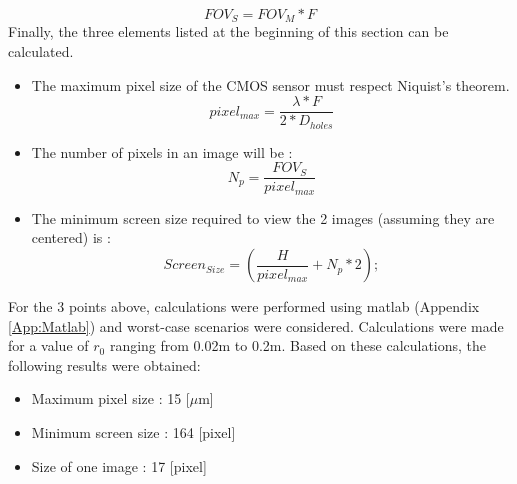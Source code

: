 \begin{equation}
    FOV_S = FOV_M * F
\end{equation}
Finally, the three elements listed at the beginning of this section can be calculated.
\begin{itemize}
    \item The maximum pixel size of the CMOS sensor must respect Niquist's theorem.
          \begin{equation}
              pixel_{max} = \frac{\lambda*F}{2*D_{holes}}
          \end{equation}
    \item The number of pixels in an image will be :
          \begin{equation}
              N_{p} = \frac{FOV_S}{pixel_{max}}
          \end{equation}
    \item The minimum screen size required to view the 2 images (assuming they are centered) is :
          \begin{equation}
              Screen_{Size} = (\frac{H}{pixel_{max}}+ N_{p}*2);
          \end{equation}
\end{itemize}
For the 3 points above, calculations were performed using matlab (Appendix \ref{App:Matlab}) and worst-case scenarios
were considered. Calculations were made for a value of $r_0$ ranging from 0.02m to 0.2m.
Based on these calculations, the following results were obtained:
\begin{itemize}
    \item Maximum pixel size : 15 [$\mu$m]
    \item Minimum screen size : 164 [pixel]
    \item Size of one image : 17 [pixel]
\end{itemize}
